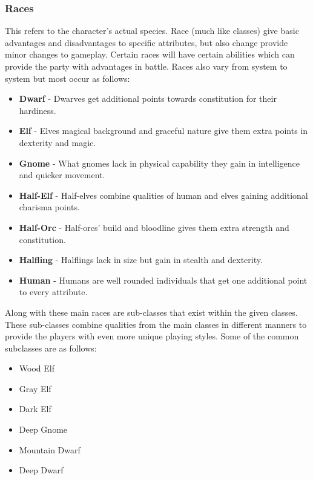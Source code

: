 \documentclass[12pt,a4paper]{report}
\begin{document}
		\subsubsection{Races}
			This refers to the character's actual species. Race (much like classes) give basic advantages and disadvantages to specific attributes, but also change provide minor changes to gameplay. Certain races will have certain abilities which can provide the party with advantages in battle. Races also vary from system to system but most occur as follows:
			\begin{itemize}
				\item \textbf{Dwarf} - Dwarves get additional points towards constitution for their hardiness.
				\item \textbf{Elf} - Elves magical background and graceful nature give them extra points in dexterity and magic.
				\item \textbf{Gnome} - What gnomes lack in physical capability they gain in intelligence and quicker movement.
				\item \textbf{Half-Elf} - Half-elves combine qualities of human and elves gaining additional charisma points.
				\item \textbf{Half-Orc} - Half-orcs’ build and bloodline gives them extra strength and constitution.
				\item \textbf{Halfling} - Halflings lack in size but gain in stealth and dexterity.
				\item \textbf{Human} - Humans are well rounded individuals that get one additional point to every attribute.
			\end{itemize}
			Along with these main races are sub-classes that exist within the given classes. These sub-classes combine qualities from the main classes in different manners to provide the players with even more unique playing styles. Some of the common subclasses are as follows:
			\begin{itemize}
				\item Wood Elf
				\item Gray Elf
				\item Dark Elf
				\item Deep Gnome
				\item Mountain Dwarf
				\item Deep Dwarf
			\end{itemize}
		\newpage
\end{document}
